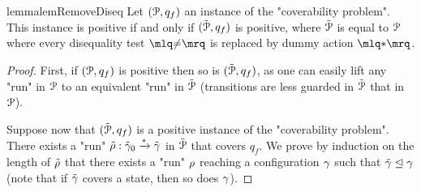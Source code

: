 
\begin{restatable}{lemma}{lemRemoveDiseq}
	\label{lem:removing_diseq_tests}
	Let $(\mathcal{P}, q_f)$ an instance of the "coverability problem". This instance is positive if and only if $(\tilde{\mathcal{P}}, q_f)$ is positive, where $\tilde{\mathcal{P}}$ is equal to $\mathcal{P}$ where every disequality test $\quotemarks{\diseqtestact}$ is replaced by dummy action $\quotemarks{\dummyact}$.  
\end{restatable}

\begin{proof}
	First, if $(\mathcal{P}, q_f)$ is positive then so is $(\tilde{\mathcal{P}}, q_f)$, as one can easily lift any "run" in $\mathcal{P}$ to an equivalent "run" in $\tilde{\mathcal{P}}$ (transitions are less guarded  in $\tilde{\mathcal{P}}$ that in $\mathcal{P}$). 
	
	Suppose now that $(\tilde{\mathcal{P}}, q_f)$ is a positive instance of the "coverability problem". There exists a "run" $\tilde{\rho}: \tilde{\gamma}_0 \xrightarrow{*} \tilde{\gamma}$ in $\tilde{\mathcal{P}}$ that covers $q_f$. We prove by induction on the length of $\tilde{\rho}$ that there exists a "run" $\rho$ reaching a configuration $\gamma$ such that $\tilde{\gamma} \trianglelefteq \gamma$ (note that if $\tilde{\gamma}$ covers a state, then so does $\gamma$). 
	

\end{proof}
